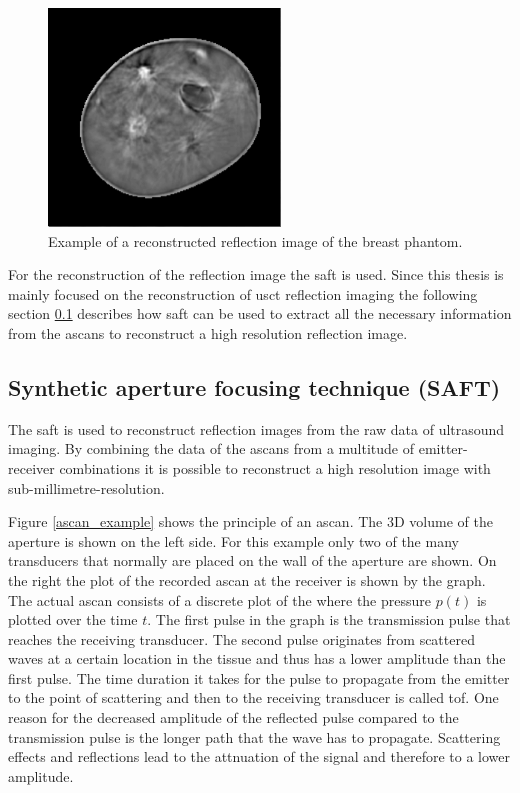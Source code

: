 \begin{figure}[H]
    \centering
    \includegraphics[width=0.55\textwidth]{Graphics/reflection_example.png}
    \caption{ Example of a reconstructed reflection image of the breast phantom.}
    \label{reflecimage_example}
\end{figure}
For the reconstruction of the reflection image the \ac{saft} is used. Since this thesis is mainly focused on the reconstruction of \ac{usct} reflection imaging the following section \ref{sec:SAFT} describes how \ac{saft} can be used to extract all the necessary information from the \acp{ascan} to reconstruct a high resolution reflection image. 






\subsection{Synthetic aperture focusing technique (SAFT)}
\label{sec:SAFT}
The \ac{saft} is used to reconstruct reflection images from the raw data of ultrasound imaging. By combining the data of the \acp{ascan} from a multitude of emitter-receiver combinations it is possible to reconstruct a high resolution image with sub-millimetre-resolution.

Figure \ref{ascan_example} shows the principle of an \ac{ascan}. The 3D volume of the aperture is shown on the left side. For this example only two of the many transducers that normally are placed on the wall of the aperture are shown. On the right the plot of the recorded \ac{ascan} at the receiver is shown by the graph. The actual \ac{ascan} consists of a discrete plot of the where the pressure $p(t)$ is plotted over the time $t$. The first pulse in the graph is the transmission pulse that reaches the receiving transducer. The second pulse originates from scattered waves at a certain location in the tissue and thus has a lower amplitude than the first pulse. The time duration it takes for the pulse to propagate from the emitter to the point of scattering and then to the receiving transducer is called \ac{tof}. One reason for the decreased amplitude of the reflected pulse compared to the transmission pulse is the longer path that the wave has to propagate. Scattering effects and reflections lead to the attnuation of the signal and therefore to a lower amplitude. 



